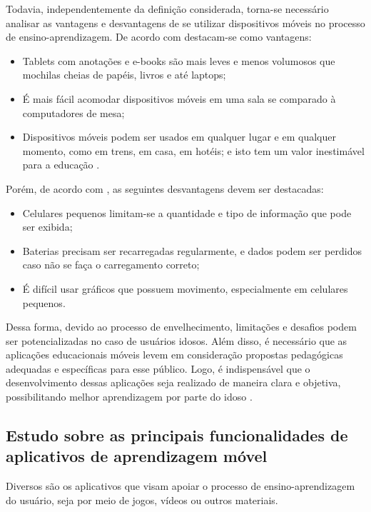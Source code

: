Todavia, independentemente da definição considerada, torna-se necessário analisar as vantagens e desvantagens de se utilizar dispositivos móveis no processo de ensino-aprendizagem. De acordo com \cite{RICHAMEHTA2016} destacam-se como vantagens: 

\begin{itemize}
    \item Tablets com anotações e e-books são mais leves e menos volumosos que mochilas cheias de papéis, livros e até laptops;
    \item É mais fácil acomodar dispositivos móveis em uma sala se comparado à computadores de mesa;
    \item Dispositivos móveis podem ser usados em qualquer lugar e em qualquer momento, como em trens, em casa, em hotéis; e isto tem um valor inestimável para a educação \citep{CarmaMaia2008}.
\end{itemize}

Porém, de acordo com \cite{RICHAMEHTA2016}, as seguintes desvantagens devem ser destacadas: 

\begin{itemize}
    \item Celulares pequenos limitam-se a quantidade e tipo de informação que pode ser exibida;
    \item Baterias precisam ser recarregadas regularmente, e dados podem ser perdidos caso não se faça o carregamento correto;
    \item É difícil usar gráficos que possuem movimento, especialmente em celulares pequenos.
\end{itemize}

Dessa forma, devido ao processo de envelhecimento, limitações e desafios podem ser potencializadas no caso de usuários idosos. Além disso, é necessário que as aplicações educacionais móveis levem em consideração propostas pedagógicas adequadas e específicas para esse público. Logo, é indispensável que o desenvolvimento dessas aplicações seja realizado de maneira clara e objetiva, possibilitando melhor aprendizagem por parte do idoso \citep{giubilei1993pedagogia}.

\subsection{Estudo sobre as principais funcionalidades de aplicativos de aprendizagem móvel}

Diversos são os aplicativos que visam apoiar o processo de ensino-aprendizagem do usuário, seja por meio de jogos, vídeos ou outros materiais. 

